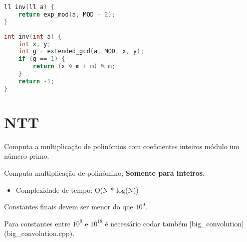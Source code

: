 \documentclass[11pt, a4paper, oneside]{book}
\begin{document}
\hfill

\begin{multicols}{2}
\begin{lstlisting}[language=C++]
ll inv(ll a) {
    return exp_mod(a, MOD - 2);
}
\end{lstlisting}
\end{multicols}

\hfill

\begin{multicols}{2}
\begin{lstlisting}[language=C++]
int inv(int a) {
    int x, y;
    int g = extended_gcd(a, MOD, x, y);
    if (g == 1) {
        return (x % m + m) % m;
    }
    return -1;
}
\end{lstlisting}
\end{multicols}

\hfill

\section{NTT}


Computa a multiplicação de polinômios com coeficientes inteiros módulo um número primo.



Computa multiplicação de polinômino; \textbf{Somente para inteiros}.



\begin{itemize}
\item Complexidade de tempo: O(N * log(N))
\end{itemize}



Constantes finais devem ser menor do que $10^9$.  

Para constantes entre $10^9$ e $10^{18}$ é necessário codar também [big\_convolution](big\_convolution.cpp).

\hfill
\end{document}
